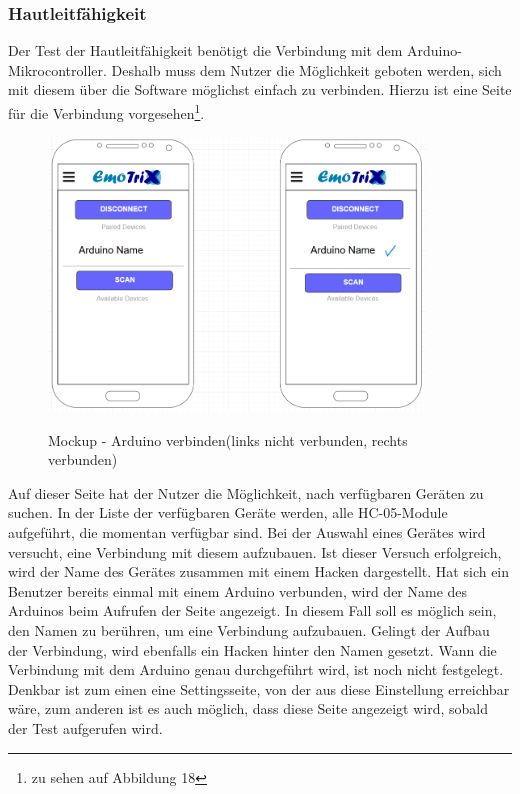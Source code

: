 \subsubsection{Hautleitfähigkeit}
Der Test der Hautleitfähigkeit benötigt die Verbindung mit dem Arduino-Mikrocontroller. Deshalb muss dem Nutzer die Möglichkeit geboten werden, sich mit diesem über die Software möglichst einfach zu verbinden. Hierzu ist eine Seite für die Verbindung vorgesehen\footnote{zu sehen auf Abbildung 18}. 
\begin{figure}[h]
	\centering
	\includegraphics[width=10cm]{Bilder/Mockup-Arduino-Connection.png}
	\label{img:Mockup-Arduino-Connection}
	\caption[Mockup - Arduino verbinden(links nicht verbunden, rechts verbunden)]{Mockup - Arduino verbinden(links nicht verbunden, rechts verbunden)}
\end{figure}%
Auf dieser Seite hat der Nutzer die Möglichkeit, nach verfügbaren Geräten zu suchen. In der Liste der verfügbaren Geräte werden, alle HC-05-Module aufgeführt, die momentan verfügbar sind. Bei der Auswahl eines Gerätes wird versucht, eine Verbindung mit diesem aufzubauen. Ist dieser Versuch erfolgreich, wird der Name des Gerätes zusammen mit einem Hacken dargestellt. Hat sich ein Benutzer bereits einmal mit einem Arduino verbunden, wird der Name des Arduinos beim Aufrufen der Seite angezeigt. In diesem Fall soll es möglich sein, den Namen zu berühren, um eine Verbindung aufzubauen. Gelingt der Aufbau der Verbindung, wird ebenfalls ein Hacken hinter den Namen gesetzt.\newline
Wann die Verbindung mit dem Arduino genau durchgeführt wird, ist noch nicht festgelegt. Denkbar ist zum einen eine Settingsseite, von der aus diese Einstellung erreichbar wäre, zum anderen ist es auch möglich, dass diese Seite angezeigt wird, sobald der Test aufgerufen wird.\newline
